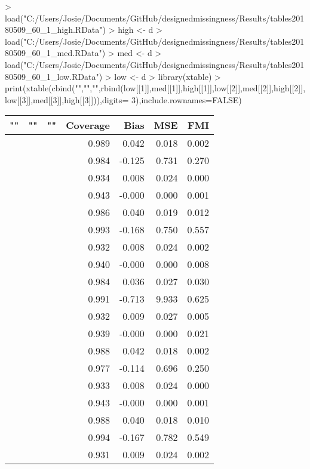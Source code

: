 \documentclass{svjour3}                     %
\begin{document}
\begin{Schunk}
\begin{Sinput}
> load("C:/Users/Josie/Documents/GitHub/designedmissingness/Results/tables20180509_60_1_high.RData")
> high <- d
> load("C:/Users/Josie/Documents/GitHub/designedmissingness/Results/tables20180509_60_1_med.RData")
> med <- d
> load("C:/Users/Josie/Documents/GitHub/designedmissingness/Results/tables20180509_60_1_low.RData")
> low <- d
> library(xtable)
> print(xtable(cbind("","","",rbind(low[[1]],med[[1]],high[[1]],low[[2]],med[[2]],high[[2]],low[[3]],med[[3]],high[[3]])),digits= 3),include.rownames=FALSE)
\end{Sinput}
\begin{Soutput}
% latex table generated in R 3.4.1 by xtable 1.8-2 package
% Wed May 16 16:26:28 2018
\begin{table}[ht]
\centering
\begin{tabular}{lllrrrr}
  \hline
"" & "" & "" & Coverage & Bias & MSE & FMI \\ 
  \hline
 &  &  & 0.989 & 0.042 & 0.018 & 0.002 \\ 
   &  &  & 0.984 & -0.125 & 0.731 & 0.270 \\ 
   &  &  & 0.934 & 0.008 & 0.024 & 0.000 \\ 
   &  &  & 0.943 & -0.000 & 0.000 & 0.001 \\ 
   &  &  & 0.986 & 0.040 & 0.019 & 0.012 \\ 
   &  &  & 0.993 & -0.168 & 0.750 & 0.557 \\ 
   &  &  & 0.932 & 0.008 & 0.024 & 0.002 \\ 
   &  &  & 0.940 & -0.000 & 0.000 & 0.008 \\ 
   &  &  & 0.984 & 0.036 & 0.027 & 0.030 \\ 
   &  &  & 0.991 & -0.713 & 9.933 & 0.625 \\ 
   &  &  & 0.932 & 0.009 & 0.027 & 0.005 \\ 
   &  &  & 0.939 & -0.000 & 0.000 & 0.021 \\ 
   &  &  & 0.988 & 0.042 & 0.018 & 0.002 \\ 
   &  &  & 0.977 & -0.114 & 0.696 & 0.250 \\ 
   &  &  & 0.933 & 0.008 & 0.024 & 0.000 \\ 
   &  &  & 0.943 & -0.000 & 0.000 & 0.001 \\ 
   &  &  & 0.988 & 0.040 & 0.018 & 0.010 \\ 
   &  &  & 0.994 & -0.167 & 0.782 & 0.549 \\ 
   &  &  & 0.931 & 0.009 & 0.024 & 0.002 \\ 

\end{tabular}
\end{table}
\end{Soutput}
\end{Schunk}
\end{document}
